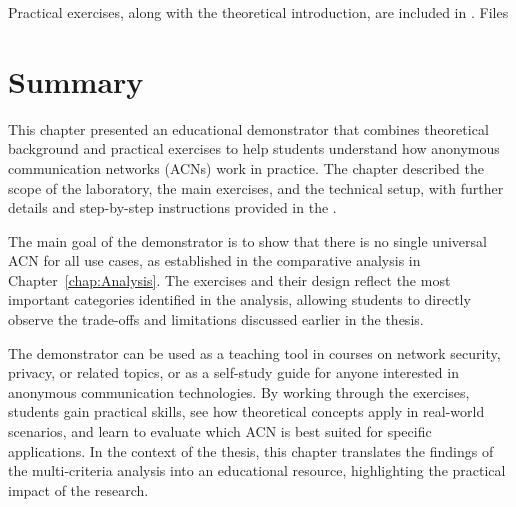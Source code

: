 Practical exercises, along with the theoretical introduction, are included in . Files

\section{Summary}

This chapter presented an educational demonstrator that combines theoretical background and practical exercises to help students understand how anonymous communication networks (ACNs) work in practice. The chapter described the scope of the laboratory, the main exercises, and the technical setup, with further details and step-by-step instructions provided in the .

The main goal of the demonstrator is to show that there is no single universal ACN for all use cases, as established in the comparative analysis in Chapter~\ref{chap:Analysis}. The exercises and their design reflect the most important categories identified in the analysis, allowing students to directly observe the trade-offs and limitations discussed earlier in the thesis. 

The demonstrator can be used as a teaching tool in courses on network security, privacy, or related topics, or as a self-study guide for anyone interested in anonymous communication technologies. By working through the exercises, students gain practical skills, see how theoretical concepts apply in real-world scenarios, and learn to evaluate which ACN is best suited for specific applications. In the context of the thesis, this chapter translates the findings of the multi-criteria analysis into an educational resource, highlighting the practical impact of the research.
